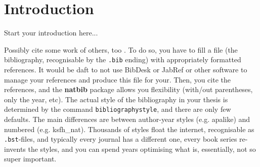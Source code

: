 \chapter{Introduction}
\label{ch:introduction}


Start your introduction here...

Possibly cite some work of others, too \citep{Adiku.ea:1995:USO}. To do so, you have to fill a file (the bibliography, recognisable by the \texttt{.bib} ending) with appropriately formatted references. It would be daft to not use BibDesk or JabRef or other software to manage your references and produce this file for your. Then, you cite the references, and the \textbf{natbib} package allows you flexibility (with/out parentheses, only the year, etc). The actual style of the bibliography in your thesis is determined by the command \texttt{bibliographystyle}, and there are only few defaults. The main differences are between author-year styles (e.g. apalike) and numbered (e.g. ksfh\_nat). Thousands of styles float the internet, recognisable as \texttt{.bst}-files, and typically every journal has a different one, every book series re-invents the styles, and you can spend years optimising what is, essentially, not so super important.

